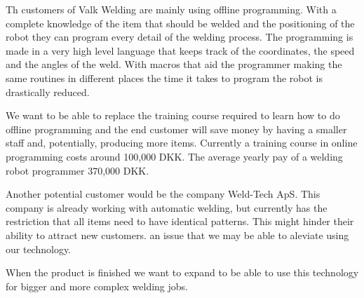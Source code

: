 Th customers of Valk Welding are mainly using offline programming.
With a complete knowledge of the item that should be welded and the positioning of the robot they can program every detail of the welding process.
The programming is made in a very high level language that keeps track of the coordinates, the speed and the angles of the weld.
With macros that aid the programmer making the same routines in different places the time it takes to program the robot is drastically reduced.

We want to be able to replace the training course required to learn how to do offline programming and the end customer will save money by having a smaller staff and, potentially, producing more items. 
Currently a training course in online programming costs around 100,000 DKK\cite{valk_welding_summary}. 
The average yearly pay of a welding robot programmer 370,000 DKK\cite{welding_salary}. 

Another potential customer would be the company Weld-Tech ApS. 
This company is already working with automatic welding, but currently has the restriction that all items need to have identical patterns. 
This might hinder their ability to attract new customers. an issue that we may be able to aleviate using our technology.

When the product is finished we want to expand to be able to use this technology for bigger and more complex welding jobs.

